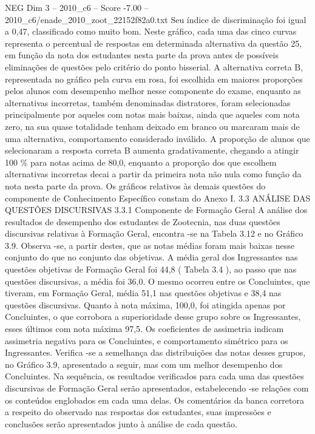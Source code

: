 \begin{textsample}{NEG Dim 3 – 2010\_c6 – Score -7.00 – 2010\_c6/enade\_2010\_zoot\_22152f82a0.txt}
Seu índice de discriminação foi igual a 0,47, classificado como muito bom.
Neste gráfico, cada uma das cinco curvas representa o percentual de respostas em determinada alternativa da questão 25, em função da nota dos estudantes nesta parte da prova antes de possíveis eliminações de questões pelo critério do ponto bisserial.
A alternativa correta B, representada no gráfico pela curva em rosa, foi escolhida em maiores proporções pelos alunos com desempenho melhor nesse componente do exame, enquanto as alternativas incorretas, também denominadas distratores, foram selecionadas principalmente por aqueles com notas mais baixas, ainda que aqueles com nota zero, na sua quase totalidade tenham deixado em branco ou marcaram mais de uma alternativa, comportamento considerado inválido.
A proporção de alunos que selecionaram a resposta correta B aumenta gradativamente, chegando a atingir 100 \% para notas acima de 80,0, enquanto a proporção dos que escolhem alternativas incorretas decai a partir da primeira nota não nula como função da nota nesta parte da prova.
Os gráficos relativos às demais questões do componente de Conhecimento Específico constam do Anexo I. 3.3 ANÁLISE DAS QUESTÕES DISCURSIVAS 3.3.1 Componente de Formação Geral A análise dos resultados de desempenho dos estudantes de Zootecnia, nas duas questões discursivas relativas à Formação Geral, encontra -se na Tabela 3.12 e no Gráfico 3.9.
Observa -se, a partir destes, que as notas médias foram mais baixas nesse conjunto do que no conjunto das objetivas.
A média geral dos Ingressantes nas questões objetivas de Formação Geral foi 44,8 ( Tabela 3.4 ), ao passo que nas questões discursivas, a média foi 36,0.
O mesmo ocorreu entre os Concluintes, que tiveram, em Formação Geral, média 51,1 nas questões objetivas e 38,4 nas questões discursivas.
Quanto à nota máxima, 100,0, foi atingida apenas por Concluintes, o que corrobora a superioridade desse grupo sobre os Ingressantes, esses últimos com nota máxima 97,5.
Os coeficientes de assimetria indicam assimetria negativa para os Concluintes, e comportamento simétrico para os Ingressantes.
Verifica -se a semelhança das distribuições das notas desses grupos, no Gráfico 3.9, apresentado a seguir, mas com um melhor desempenho dos Concluintes.
Na sequência, os resultados verificados para cada uma das questões discursivas de Formação Geral serão apresentados, estabelecendo -se relações com os conteúdos englobados em cada uma delas.
Os comentários da banca corretora a respeito do observado nas respostas dos estudantes, suas impressões e conclusões serão apresentados junto à análise de cada questão.

\end{textsample}
